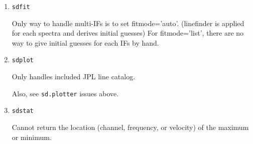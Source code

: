\begin{enumerate}
\item {\tt sdfit}

%
Only way to handle multi-IFs is to set fitmode='auto'.
(linefinder is applied for each spectra and derives initial guesses)
For fitmode='list', there are no way to give initial guesses for each IFs by hand.

\item {\tt sdplot}

  Only handles included JPL line catalog.

  Also, see {\tt sd.plotter} issues above.

\item {\tt sdstat}

  Cannot return the location (channel, frequency, or velocity) of the
  maximum or minimum.

\end{enumerate}


